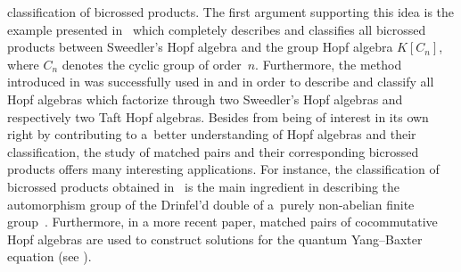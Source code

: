 \documentclass[pdftex]{sigma}
\numberwithin{equation}{section}
\begin{document}
classification of bicrossed products. The first argument supporting this idea is the example presented in~\cite{abm} which completely describes and classifies all bicrossed products between Sweedler's Hopf algebra and the group Hopf algebra $K[C_{n}]$, where $C_n$ denotes the cyclic group of order~$n$. Furthermore, the method introduced in \cite{abm} was successfully used in \cite{Gabi} and \cite{aa} in order to describe and classify all
Hopf algebras which factorize through two Sweedler's Hopf algebras and respectively two Taft Hopf algebras. Besides from being of interest in its own right by contributing to a~better understan\-ding of Hopf algebras and their classification, the study of matched pairs and their corresponding bicrossed products offers many interesting applications. For instance, the classification of bicrossed products obtained in~\cite{abm} is the main ingredient in describing the automorphism group of the Drinfel'd double of a~purely non-abelian finite group~\cite{marc1}. Furthermore, in a more recent paper, matched pairs of cocommutative Hopf algebras are used to construct solutions for the quantum Yang--Baxter equation (see \cite[Proposition~3.2]{agv}).
\end{document}
